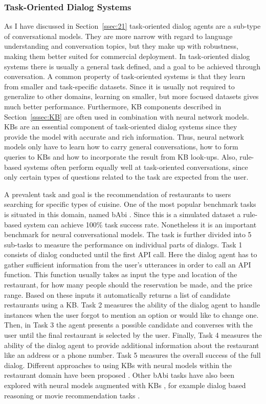 \documentclass[12pt]{article}
\begin{document}
\subsubsection{Task-Oriented Dialog Systems} \label{sssec:task}
As I have discussed in Section~\ref{ssec:21} task-oriented dialog agents are a sub-type of conversational models. They are more narrow with regard to language understanding and conversation topics, but they make up with robustness, making them better suited for commercial deployment. In task-oriented dialog systems there is usually a general task defined, and a goal to be achieved through conversation. A common property of task-oriented systems is that they learn from smaller and task-specific datasets. Since it is usually not required to generalize to other domains, learning on smaller, but more focused datasets gives much better performance. Furthermore, KB components described in Section~\ref{sssec:KB} are often used in combination with neural network models. KBs are an essential component of task-oriented dialog systems since they provide the model with accurate and rich information. Thus, neural network models only have to learn how to carry general conversations, how to form queries to KBs and how to incorporate the result from KB look-ups. Also, rule-based systems often perform equally well at task-oriented conversations, since only certain types of questions related to the task are expected from the user.

A prevalent task and goal is the recommendation of restaurants to users searching for specific types of cuisine. One of the most popular benchmark tasks is situated in this domain, named bAbi \cite{Bordes:2016,Joshi:2017,bAbi}. Since this is a simulated dataset a rule-based system can achieve 100\(\%\) task success rate. Nonetheless it is an important benchmark for neural conversational models. The task is further divided into 5 sub-tasks to measure the performance on individual parts of dialogs. Task 1 consists of dialog conducted until the first API call. Here the dialog agent has to gather sufficient information from the user's utterances in order to call an API function. This function usually takes as input the type and location of the restaurant, for how many people should the reservation be made, and the price range. Based on these inputs it automatically returns a list of candidate restaurants using a KB. Task 2 measures the ability of the dialog agent to handle instances when the user forgot to mention an option or would like to change one. Then, in Task 3 the agent presents a possible candidate and converses with the user until the final restaurant is selected by the user. Finally, Task 4 measures the ability of the dialog agent to provide additional information about the restaurant like an address or a phone number. Task 5 measures the overall success of the full dialog. Different approaches to using KBs with neural models within the restaurant domain have been proposed \cite{Wen:2016,Eric:2017,Williams:2017}. Other bAbi tasks have also been explored with neural models augmented with KBs \cite{Williams:2017,Li_HIL:2016}, for example dialog based reasoning \cite{Weston:2015} or movie recommendation tasks \cite{Miller:2016,Dodge:2015}.
\end{document}
